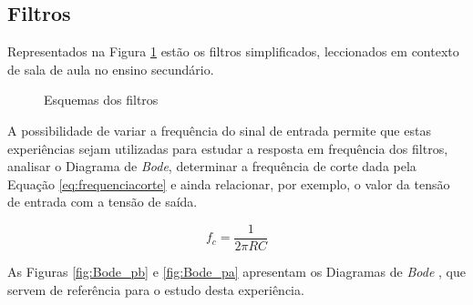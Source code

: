 \subsection{Filtros}
Representados na Figura \ref{fig:filtrosesqgeral} estão os filtros simplificados, leccionados em contexto de sala de aula no ensino secundário.

\begin{figure}[hbtp]
	\centering%
		\centering
		\qquad
		\caption{Esquemas dos filtros \cite{sedrasmith}}%
		\label{fig:filtrosesqgeral}%
\end{figure}

A possibilidade de variar a frequência do sinal de entrada permite que estas experiências sejam utilizadas para estudar a resposta em frequência dos filtros, analisar o Diagrama de \textit{Bode}, determinar a frequência de corte dada pela Equação \ref{eq:frequenciacorte} e ainda relacionar, por exemplo, o valor da tensão de entrada com a tensão de saída. 

\begin{equation} \label{eq:frequenciacorte}
	f_{c} = \frac{1}{2\pi RC}
\end{equation}

As Figuras \ref{fig:Bode_pb} e \ref{fig:Bode_pa} apresentam os Diagramas de \textit{Bode} , que servem de referência para o estudo desta experiência. 


